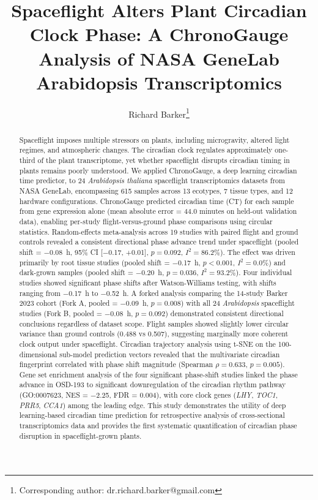 \documentclass[11pt,a4paper]{article}
\title{Spaceflight Alters Plant Circadian Clock Phase: A ChronoGauge Analysis of NASA GeneLab Arabidopsis Transcriptomics}
\author[1]{Richard Barker\thanks{Corresponding author: dr.richard.barker@gmail.com}}
\affil[1]{Department of Botany, University of Wisconsin-Madison, Madison, WI, USA}
\date{}
\begin{document}
\maketitle

\begin{abstract}
Spaceflight imposes multiple stressors on plants, including microgravity, altered light regimes, and atmospheric changes. The circadian clock regulates approximately one-third of the plant transcriptome, yet whether spaceflight disrupts circadian timing in plants remains poorly understood. We applied ChronoGauge, a deep learning circadian time predictor, to 24 \textit{Arabidopsis thaliana} spaceflight transcriptomics datasets from NASA GeneLab, encompassing 615 samples across 13 ecotypes, 7 tissue types, and 12 hardware configurations. ChronoGauge predicted circadian time (CT) for each sample from gene expression alone (mean absolute error = 44.0 minutes on held-out validation data), enabling per-study flight-versus-ground phase comparisons using circular statistics. Random-effects meta-analysis across 19 studies with paired flight and ground controls revealed a consistent directional phase advance trend under spaceflight (pooled shift = $-$0.08~h, 95\% CI [$-$0.17, $+$0.01], $p = 0.092$, $I^2 = 86.2\%$). The effect was driven primarily by root tissue studies (pooled shift = $-$0.17~h, $p < 0.001$, $I^2 = 0.0\%$) and dark-grown samples (pooled shift = $-$0.20~h, $p = 0.036$, $I^2 = 93.2\%$). Four individual studies showed significant phase shifts after Watson-Williams testing, with shifts ranging from $-$0.17~h to $-$0.52~h. A forked analysis comparing the 14-study Barker 2023 cohort (Fork A, pooled = $-$0.09~h, $p = 0.008$) with all 24 \textit{Arabidopsis} spaceflight studies (Fork B, pooled = $-$0.08~h, $p = 0.092$) demonstrated consistent directional conclusions regardless of dataset scope. Flight samples showed slightly lower circular variance than ground controls (0.488 vs 0.507), suggesting marginally more coherent clock output under spaceflight. Circadian trajectory analysis using t-SNE on the 100-dimensional sub-model prediction vectors revealed that the multivariate circadian fingerprint correlated with phase shift magnitude (Spearman $\rho = 0.633$, $p = 0.005$). Gene set enrichment analysis of the four significant phase-shift studies linked the phase advance in OSD-193 to significant downregulation of the circadian rhythm pathway (GO:0007623, NES = $-$2.25, FDR = 0.004), with core clock genes (\textit{LHY}, \textit{TOC1}, \textit{PRR5}, \textit{CCA1}) among the leading edge. This study demonstrates the utility of deep learning-based circadian time prediction for retrospective analysis of cross-sectional transcriptomics data and provides the first systematic quantification of circadian phase disruption in spaceflight-grown plants.
\end{abstract}
\end{document}
